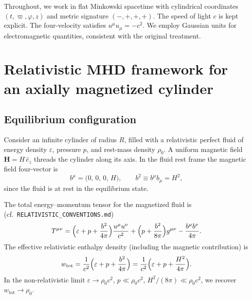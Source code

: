 Throughout, we work in flat Minkowski spacetime with cylindrical
coordinates $(t, \varpi, \varphi, z)$ and metric signature
$(-,+,+,+)$.  The speed of light $c$ is kept explicit.  The
four-velocity satisfies $u^{\mu}u_{\mu} = -c^{2}$.  We employ Gaussian
units for electromagnetic quantities, consistent with the original
treatment.

\section{Relativistic MHD framework for an axially magnetized cylinder}
\label{sec:rel-12-110-framework}

\subsection{Equilibrium configuration}
\label{sec:rel-12-110-equil}

Consider an infinite cylinder of radius $R$, filled with a
relativistic perfect fluid of energy density $\varepsilon$, pressure
$p$, and rest-mass density $\rho_{0}$.  A uniform magnetic field
$\mathbf{H} = H\,\hat{e}_{z}$ threads the cylinder along its axis.
In the fluid rest frame the magnetic field four-vector is
\begin{equation}
\label{eq:rel-12-110-1}
b^{\mu} = \bigl(0,\,0,\,0,\,H\bigr),\qquad
b^{2} \equiv b^{\mu}b_{\mu} = H^{2},
\end{equation}
since the fluid is at rest in the equilibrium state.

The total energy--momentum tensor for the magnetized fluid is
(cf.\ \texttt{RELATIVISTIC\_CONVENTIONS.md})
\begin{equation}
\label{eq:rel-12-110-2}
T^{\mu\nu} = \Bigl(\varepsilon + p + \frac{b^{2}}{4\pi}\Bigr)
\frac{u^{\mu}u^{\nu}}{c^{2}}
+ \Bigl(p + \frac{b^{2}}{8\pi}\Bigr) g^{\mu\nu}
- \frac{b^{\mu}b^{\nu}}{4\pi}.
\end{equation}
The effective relativistic enthalpy density (including the magnetic
contribution) is
\begin{equation}
\label{eq:rel-12-110-3}
w_{\mathrm{tot}} = \frac{1}{c^{2}}\Bigl(\varepsilon + p
+ \frac{b^{2}}{4\pi}\Bigr)
= \frac{1}{c^{2}}\Bigl(\varepsilon + p
+ \frac{H^{2}}{4\pi}\Bigr).
\end{equation}
In the non-relativistic limit $\varepsilon \to \rho_{0}c^{2}$,
$p \ll \rho_{0}c^{2}$, $H^{2}/(8\pi) \ll \rho_{0}c^{2}$, we recover
$w_{\mathrm{tot}} \to \rho_{0}$.

